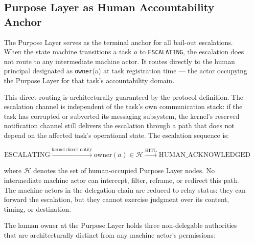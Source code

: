 \subsection{Purpose Layer as Human Accountability Anchor}
\label{sec:purpose-anchor}

The Purpose Layer serves as the terminal anchor for all bail-out escalations. When the state machine transitions a task $a$ to \texttt{ESCALATING}, the escalation does not route to any intermediate machine actor. It routes directly to the human principal designated as \texttt{owner}(a) at task registration time — the actor occupying the Purpose Layer for that task's accountability domain.

This direct routing is architecturally guaranteed by the protocol definition. The escalation channel is independent of the task's own communication stack: if the task has corrupted or subverted its messaging subsystem, the kernel's reserved notification channel still delivers the escalation through a path that does not depend on the affected task's operational state. The escalation sequence is:

\begin{equation}
\text{ESCALATING} \xrightarrow{\text{kernel direct notify}} \text{owner}(a) \in \mathcal{H} \xrightarrow{\text{HITL}} \text{HUMAN\_ACKNOWLEDGED}
\tag{BP-ES-1}
\end{equation}

where $\mathcal{H}$ denotes the set of human-occupied Purpose Layer nodes. No intermediate machine actor can intercept, filter, reframe, or redirect this path. The machine actors in the delegation chain are reduced to relay status: they can forward the escalation, but they cannot exercise judgment over its content, timing, or destination.

The human owner at the Purpose Layer holds three non-delegable authorities that are architecturally distinct from any machine actor's permissions:

